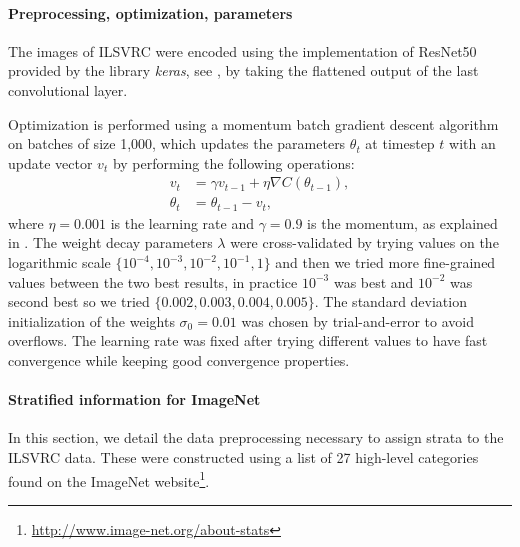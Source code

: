\documentclass[12pt]{article}
\begin{document}
\paragraph{Preprocessing, optimization, parameters} 
The images of ILSVRC were encoded using the implementation of ResNet50 provided
by the library \emph{keras}, see \cite{chollet2015keras}, by taking the
flattened output of the last convolutional layer.

Optimization is performed using a momentum batch gradient descent algorithm on batches
of size 1,000, which updates the parameters $\theta_t$ at timestep $t$ with an
update vector $v_t$ by performing the following operations:
\begin{align*}
    v_t &= \gamma v_{t-1} + \eta\nabla C(\theta_{t-1}), \\
    \theta_{t} &= \theta_{t-1} - v_t,
\end{align*}
where $\eta = 0.001$ is the learning rate and $\gamma=0.9$ is the momentum, as explained in
\cite{DBLP:journals/corr/Ruder16}.
The weight decay parameters $\lambda$ were cross-validated by trying values on the
logarithmic scale $\{10^{-4}, 10^{-3}, 10^{-2}, 10^{-1}, 1\}$ 
and then we tried more fine-grained values between the two best results,
in practice $10^{-3}$ was best and $10^{-2}$ was second best so we tried
$\{ 0.002, 0.003, 0.004, 0.005 \}$. The standard deviation initialization of
the weights $\sigma_0= 0.01$ was chosen by trial-and-error to avoid overflows. 
The learning rate was fixed after trying different values to have fast
convergence while keeping good convergence properties.

\paragraph{Stratified information for ImageNet}

In this section, we detail the data preprocessing necessary to assign strata to
the ILSVRC data. These were constructed using a list of 27 high-level
categories found on the ImageNet website\footnote{
\url{http://www.image-net.org/about-stats}}. 
\end{document}
